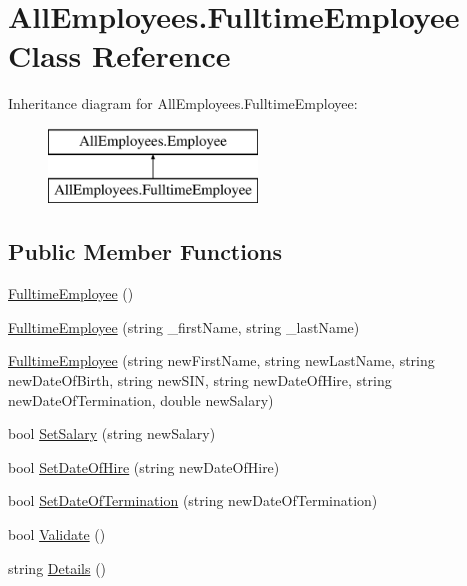 \hypertarget{class_all_employees_1_1_fulltime_employee}{}\section{All\+Employees.\+Fulltime\+Employee Class Reference}
\label{class_all_employees_1_1_fulltime_employee}
Inheritance diagram for All\+Employees.\+Fulltime\+Employee\+:\begin{figure}[H]
\begin{center}
\leavevmode
\includegraphics[height=2.000000cm]{class_all_employees_1_1_fulltime_employee}
\end{center}
\end{figure}
\subsection*{Public Member Functions}
\begin{DoxyCompactItemize}
\item 
\hyperlink{class_all_employees_1_1_fulltime_employee_a2f7744fed20aa3161c5ac5cd37c1a281}{Fulltime\+Employee} ()
\item 
\hyperlink{class_all_employees_1_1_fulltime_employee_aff9f27a0481dfb927db92c817738efb8}{Fulltime\+Employee} (string \+\_\+first\+Name, string \+\_\+last\+Name)
\item 
\hyperlink{class_all_employees_1_1_fulltime_employee_a90b4c1a4f4a8e38893ab23570cc27b94}{Fulltime\+Employee} (string new\+First\+Name, string new\+Last\+Name, string new\+Date\+Of\+Birth, string new\+S\+I\+N, string new\+Date\+Of\+Hire, string new\+Date\+Of\+Termination, double new\+Salary)
\item 
bool \hyperlink{class_all_employees_1_1_fulltime_employee_a81d8a294e5db8bb3edf92d100c828834}{Set\+Salary} (string new\+Salary)
\item 
bool \hyperlink{class_all_employees_1_1_fulltime_employee_a68003d482f284c79ed0fb00a231279b5}{Set\+Date\+Of\+Hire} (string new\+Date\+Of\+Hire)
\item 
bool \hyperlink{class_all_employees_1_1_fulltime_employee_a8e550d7b660086fb7493e2e5fbba924b}{Set\+Date\+Of\+Termination} (string new\+Date\+Of\+Termination)
\item 
bool \hyperlink{class_all_employees_1_1_fulltime_employee_a3e718749e4730c0f2a28f820530071da}{Validate} ()
\item 
string \hyperlink{class_all_employees_1_1_fulltime_employee_a7660032e944e78c6ff26598aa7107796}{Details} ()
\end{DoxyCompactItemize}
